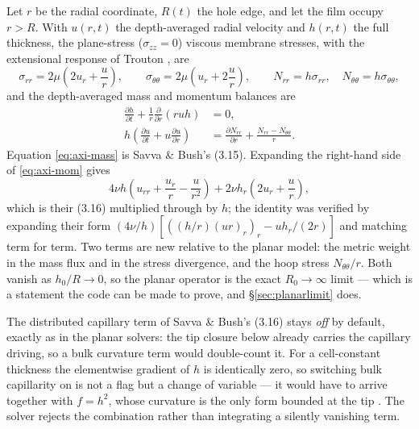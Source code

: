 \documentclass[11pt,a4paper]{article}
\begin{document}
Let $r$ be the radial coordinate, $R(t)$ the hole edge, and let the film occupy
$r > R$. With $u(r,t)$ the depth-averaged radial velocity and $h(r,t)$ the full
thickness, the plane-stress ($\sigma_{zz}=0$) viscous membrane stresses, with the
extensional response of Trouton \cite{trouton1906}, are
%
\begin{equation}
  \sigma_{rr} = 2\mu\left(2 u_{r} + \frac{u}{r}\right),
  \qquad
  \sigma_{\theta\theta} = 2\mu\left(u_{r} + 2\frac{u}{r}\right),
  \qquad
  N_{rr} = h\sigma_{rr}, \quad N_{\theta\theta} = h\sigma_{\theta\theta},
  \label{eq:membrane}
\end{equation}
%
and the depth-averaged mass and momentum balances are
%
\begin{align}
  \frac{\partial h}{\partial t}
    + \frac{1}{r}\frac{\partial}{\partial r}\left(r u h\right) &= 0,
  \label{eq:axi-mass}\\[2pt]
  h\left(\frac{\partial u}{\partial t} + u\frac{\partial u}{\partial r}\right)
    &= \frac{\partial N_{rr}}{\partial r}
       + \frac{N_{rr}-N_{\theta\theta}}{r} .
  \label{eq:axi-mom}
\end{align}
%
Equation \eqref{eq:axi-mass} is Savva \& Bush's (3.15). Expanding the
right-hand side of \eqref{eq:axi-mom} gives
%
\begin{equation}
  4\nu h\left(u_{rr} + \frac{u_{r}}{r} - \frac{u}{r^{2}}\right)
  + 2\nu h_{r}\left(2u_{r} + \frac{u}{r}\right),
  \label{eq:axi-expanded}
\end{equation}
%
which is their (3.16) multiplied through by $h$; the identity was verified by
expanding their form
$(4\nu/h)\left[\left((h/r)(ur)_{r}\right)_{r} - u h_{r}/(2r)\right]$ and
matching term for term. Two terms are new relative to the planar model: the
metric weight in the mass flux and in the stress divergence, and the hoop stress
$N_{\theta\theta}/r$. Both vanish as $h_{0}/R \to 0$, so the planar operator is
the exact $R_{0}\to\infty$ limit --- which is a statement the code can be made
to prove, and \S\ref{sec:planarlimit} does.

The distributed capillary term of Savva \& Bush's (3.16) stays \emph{off} by
default, exactly as in the planar solvers: the tip closure below already
carries the capillary driving, so a bulk curvature term would double-count it.
For a cell-constant thickness the elementwise gradient of $h$ is identically
zero, so switching bulk capillarity on is not a flag but a change of variable
--- it would have to arrive together with $f = h^{2}$, whose curvature is the
only form bounded at the tip \cite{savva2009}. The solver rejects the
combination rather than integrating a silently vanishing term.
\end{document}

